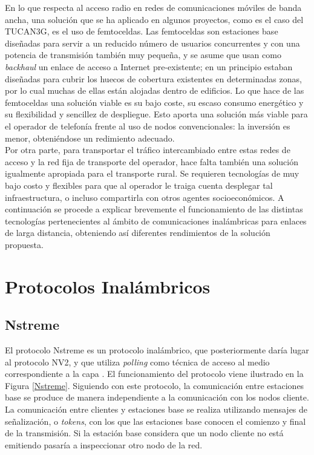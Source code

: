 	En lo que respecta al acceso radio en redes de comunicaciones móviles de banda ancha, una solución que se ha aplicado en algunos proyectos, como es el caso del TUCAN3G, es el uso de femtoceldas. Las femtoceldas son estaciones base diseñadas para servir a un reducido número de usuarios concurrentes y con una potencia de transmisión también muy pequeña, y se asume que usan como \textit{backhaul} un enlace de acceso a Internet pre-existente; en un principio estaban diseñadas para cubrir los huecos de cobertura existentes en determinadas zonas, por lo cual muchas de ellas están alojadas dentro de edificios. Lo que hace de las femtoceldas una solución viable es su bajo coste, su escaso consumo energético y su flexibilidad y sencillez de despliegue. Esto aporta una solución más viable para el operador de telefonía frente al uso de nodos convencionales: la inversión es menor, obteniéndose un redimiento adecuado.\\
	
	Por otra parte, para transportar el tráfico intercambiado entre estas redes de acceso y la red fija de transporte del operador, hace falta también una solución igualmente apropiada para el transporte rural. Se requieren tecnologías de muy bajo costo y flexibles para que al operador le traiga cuenta desplegar tal infraestructura, o incluso compartirla con otros agentes socioeconómicos. A continuación se procede a explicar brevemente el funcionamiento de las distintas tecnologías pertenecientes al ámbito de comunicaciones inalámbricas para enlaces de larga distancia, obteniendo así diferentes rendimientos de la solución propuesta.


\section{Protocolos Inalámbricos}

		\subsection{Nstreme}
		El protocolo Nstreme es un protocolo inalámbrico, que posteriormente daría lugar al protocolo NV2, y que utiliza \textit{polling} como técnica de acceso al medio correspondiente a la capa \cite{MacLayer}. El funcionamiento del protocolo viene ilustrado en la Figura \ref{Nstreme}. Siguiendo con este protocolo, la comunicación entre estaciones base se produce de manera independiente a la comunicación con los nodos cliente. La comunicación entre clientes y estaciones base se realiza utilizando mensajes de señalización, o \textit{tokens}, con los que las estaciones base conocen el comienzo y final de la transmisión. Si la estación base considera que un nodo cliente no está emitiendo pasaría a inspeccionar otro nodo de la red.    
	

